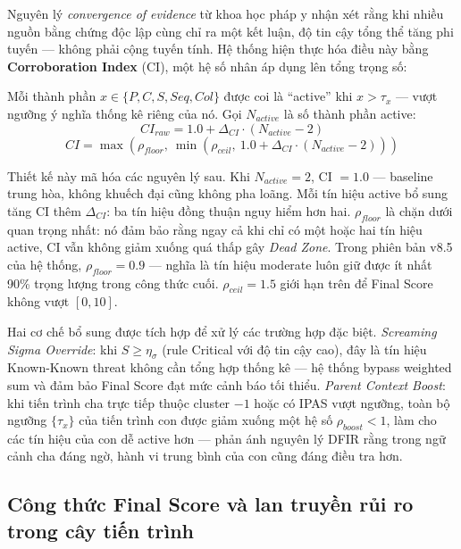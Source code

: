 \documentclass[../main.tex]{subfiles}
\begin{document}
Nguyên lý \textit{convergence of evidence} từ khoa học pháp y nhận xét rằng khi nhiều nguồn bằng chứng độc lập cùng chỉ ra một kết luận, độ tin cậy tổng thể tăng phi tuyến — không phải cộng tuyến tính. Hệ thống hiện thực hóa điều này bằng \textbf{Corroboration Index} (CI), một hệ số nhân áp dụng lên tổng trọng số:

Mỗi thành phần $x \in \{P, C, S, Seq, Col\}$ được coi là ``active'' khi $x > \tau_x$ — vượt ngưỡng ý nghĩa thống kê riêng của nó. Gọi $N_{active}$ là số thành phần active:
\begin{equation}
    CI_{raw} = 1.0 + \Delta_{CI} \cdot (N_{active} - 2) \tag{1.24}
\end{equation}
\begin{equation}
    CI = \max\!\left(\rho_{floor},\ \min\!\left(\rho_{ceil},\ 1.0 + \Delta_{CI} \cdot (N_{active} - 2)\right)\right) \tag{1.25}
\end{equation}

Thiết kế này mã hóa các nguyên lý sau. Khi $N_{active} = 2$, CI $= 1.0$ — baseline trung hòa, không khuếch đại cũng không pha loãng. Mỗi tín hiệu active bổ sung tăng CI thêm $\Delta_{CI}$: ba tín hiệu đồng thuận nguy hiểm hơn hai. $\rho_{floor}$ là chặn dưới quan trọng nhất: nó đảm bảo rằng ngay cả khi chỉ có một hoặc hai tín hiệu active, CI vẫn không giảm xuống quá thấp gây \textit{Dead Zone}. Trong phiên bản v8.5 của hệ thống, $\rho_{floor} = 0.9$ — nghĩa là tín hiệu moderate luôn giữ được ít nhất 90\% trọng lượng trong công thức cuối. $\rho_{ceil} = 1.5$ giới hạn trên để Final Score không vượt $[0, 10]$.

Hai cơ chế bổ sung được tích hợp để xử lý các trường hợp đặc biệt. \textit{Screaming Sigma Override}: khi $S \ge \eta_\sigma$ (rule Critical với độ tin cậy cao), đây là tín hiệu Known-Known threat không cần tổng hợp thống kê — hệ thống bypass weighted sum và đảm bảo Final Score đạt mức cảnh báo tối thiểu. \textit{Parent Context Boost}: khi tiến trình cha trực tiếp thuộc cluster $-1$ hoặc có IPAS vượt ngưỡng, toàn bộ ngưỡng $\{\tau_x\}$ của tiến trình con được giảm xuống một hệ số $\rho_{boost} < 1$, làm cho các tín hiệu của con dễ active hơn — phản ánh nguyên lý DFIR rằng trong ngữ cảnh cha đáng ngờ, hành vi trung bình của con cũng đáng điều tra hơn.

\subsection{Công thức Final Score và lan truyền rủi ro trong cây tiến trình}
\label{subsection:2.5.2}
\end{document}
